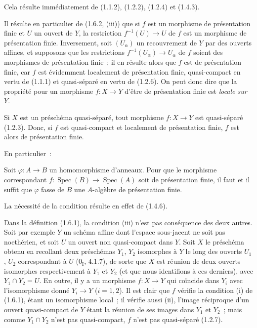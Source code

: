 Cela résulte immédiatement de (1.1.2), (1.2.2), (1.2.4) et (1.4.3).

Il résulte en particulier de (1.6.2, (iii)) que si $f$ est un morphisme de
présentation finie et $U$ un ouvert de $Y$, la restriction
$f^{-1}(U)\to U$ de $f$ est un morphisme de présentation finie. Inversement,
soit $(U_\alpha)$ un recouvrement de $Y$ par des ouverts affines, et supposons
que les restrictions $f^{-1}(U_\alpha)\to U_\alpha$ de $f$ soient des
morphismes de présentation finie~; il en résulte alors que $f$ est de
présentation finie, car $f$ est évidemment localement de présentation finie,
quasi-compact en vertu de (1.1.1) et quasi-séparé en vertu de (1.2.6). On peut
donc dire que la propriété pour un morphisme $f:X\to Y$ d'être de présentation
finie est \emph{locale sur $Y$}.

Si $X$ est un préschéma quasi-séparé, tout morphisme $f:X\to Y$ est
quasi-séparé (1.2.3). Donc, si $f$ est quasi-compact et localement de
présentation finie, $f$ est alors de présentation finie.

En particulier~:

\begin{corollary}[1.6.3]
\label{IV.1.6.3-fr}
Soit $\varphi:A\to B$ un homomorphisme d'anneaux. Pour que le morphisme
correspondant $f:\operatorname{Spec}(B)\to\operatorname{Spec}(A)$ soit de présentation finie, il faut et
il suffit que $\varphi$ fasse de $B$ une $A$-algèbre de présentation finie.
\end{corollary}

La nécessité de la condition résulte en effet de (1.4.6).

\begin{remark}[1.6.4]
\label{IV.1.6.4-fr}
Dans la définition (1.6.1), la condition (iii) n'est pas conséquence des deux
autres. Soit par exemple $Y$ un schéma affine dont l'espace sous-jacent ne
soit pas noethérien, et soit $U$ un ouvert non quasi-compact dans $Y$. Soit
$X$ le préschéma obtenu en recollant deux préschémas $Y_1$, $Y_2$ isomorphes à
$Y$ le long des ouverts $U_1$, $U_2$ correspondant à $U$ (0$_{\mathrm I}$,
4.1.7), de sorte que $X$ est réunion de deux ouverts isomorphes respectivement
à $Y_1$ et $Y_2$ (et que nous identifions à ces derniers), avec
$Y_1\cap Y_2=U$. En outre, il y a un morphisme $f:X\to Y$ qui coïncide dans
$Y_i$ avec l'isomorphisme donné $Y_i\to Y$ ($i=1,2$). Il est clair que $f$
vérifie la condition (i) de (1.6.1), étant un isomorphisme local~; il vérifie
aussi (ii), l'image réciproque d'un ouvert quasi-compact de $Y$ étant la
réunion de ses images dans $Y_1$ et $Y_2$~; mais comme $Y_1\cap Y_2$ n'est pas
quasi-compact, $f$ n'est pas quasi-séparé (1.2.7).
\end{remark}

